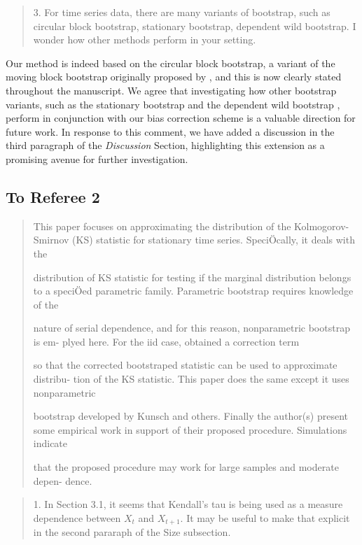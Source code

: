 \documentclass[12pt]{article}
\newenvironment{comment}%
{\begin{quotation}\noindent\small\it\color{darkblue}\ignorespaces%
}{\end{quotation}}
\begin{document}
\begin{comment}
3. For time series data, there are many variants of bootstrap, such as circular 
block bootstrap,
stationary bootstrap, dependent wild bootstrap. I wonder how other methods 
perform in
your setting.
\end{comment} 

Our method is indeed based on the circular block bootstrap, a variant
of the moving block bootstrap originally proposed by
\citet{romano1992circular}, and this is now clearly stated throughout
the manuscript. We agree that investigating how other bootstrap
variants, such as the stationary bootstrap
\citep{politis1994stationary} and the dependent wild
bootstrap \citep{shao2010dependent}, perform in conjunction with our
bias correction scheme is a valuable direction for future work. In
response to this comment, we have added a discussion in the third
paragraph of the \emph{Discussion} Section, highlighting this
extension as a promising avenue for further investigation.


\subsection*{To Referee 2}

\begin{comment}
This paper focuses on approximating the distribution of the Kolmogorov-
Smirnov (KS) statistic for stationary time series. SpeciÖcally, it deals with the

distribution of KS statistic for testing if the marginal distribution belongs to
a speciÖed parametric family. Parametric bootstrap requires knowledge of the

nature of serial dependence, and for this reason, nonparametric bootstrap is em-
plyed here. For the iid case, \citet{babu2004goodness} obtained a correction term

so that the corrected bootstraped statistic can be used to approximate distribu-
tion of the KS statistic. This paper does the same except it uses nonparametric

bootstrap developed by Kunsch and others. Finally the author(s) present some
empirical work in support of their proposed procedure. Simulations indicate

that the proposed procedure may work for large samples and moderate depen-
dence.
\end{comment}


\begin{comment}
1. In Section 3.1, it seems that Kendall's tau is being used as a measure
dependence between $X_t$ and $X_{t+1}$. It may be useful to make that explicit 
in the
second pararaph of the Size subsection.
\end{comment}
\end{document}
